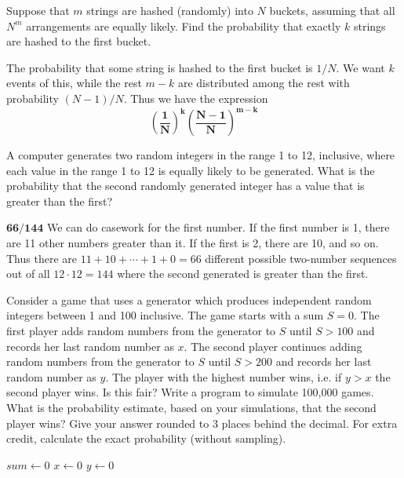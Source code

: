 \documentclass[answers]{exam}
\begin{document}
\begin{questions}
	\question Suppose that $m$ strings are hashed (randomly) into $N$ buckets, assuming that all $N^m$ arrangements are equally likely. Find the probability that exactly $k$ strings are hashed to the first bucket.
	
	\begin{solution}
		The probability that some string is hashed to the first bucket is $1/N$. We want $k$ events of this, while the rest $m - k$ are distributed among the rest with probability $(N - 1)/N$. Thus we have the expression
		\[\bm{\left(\frac{1}{N}\right)^k\left(\frac{N - 1}{N}\right)^{m - k}}\]
	\end{solution}
	
	\question A computer generates two random integers in the range 1 to 12, inclusive, where each value in the range 1 to 12 is equally likely to be generated. What is the probability that the second randomly generated integer has a value that is greater than the first?
	
	\begin{solution}
		${\bm{66/144}}$ We can do casework for the first number. If the first number is 1, there are 11 other numbers greater than it. If the first is 2, there are 10, and so on. Thus there are $11 + 10 + \cdots + 1 + 0 = 66$ different possible two-number sequences out of all $12 \cdot 12 = 144$ where the second generated is greater than the first.
	\end{solution}
	
	\question Consider a game that uses a generator which produces independent random integers between 1 and 100 inclusive. The game starts with a sum $S = 0$. The first player adds random numbers from the generator to $S$ until $S > 100$ and records her last random number as $x$. The second player continues adding random numbers from the generator to $S$ until $S > 200$ and records her last random number as $y$. The player with the highest number wins, i.e. if $y > x$ the second player wins. Is this fair? Write a program to simulate 100,000 games. What is the probability estimate, based on your simulations, that the second player wins? Give your answer rounded to 3 places behind the decimal. For extra credit, calculate the exact probability (without sampling).

	\begin{solution}
		\begin{algorithmic}
				\State $\textit{sum} \gets 0$
				\State $\textit{x} \gets 0$
				\State $\textit{y} \gets 0$


\end{algorithmic}
\end{solution}
\end{questions}
\end{document}
